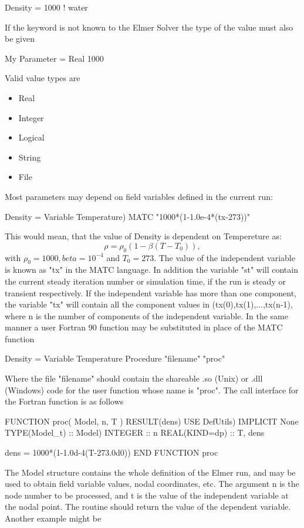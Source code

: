 \ttbegin
Density  = 1000 ! water
\ttend

If the keyword is not known to the Elmer Solver the type of the
value  must also be given

\ttbegin
My Parameter = Real 1000
\ttend

Valid value types are
\begin{itemize}
\item Real
\item Integer
\item Logical
\item String
\item File
\end{itemize}
Most parameters may depend on field variables defined in the current run:

\ttbegin
Density = Variable Temperature)
  MATC "1000*(1-1.0e-4*(tx-273))"
\ttend

This would mean, that the value of Density is dependent on Tempereture as:
\begin{equation}
  \rho =  \rho_0(1-\beta(T-T_0)),
\end{equation}
with $\rho_0=1000, beta=10^{-4}$ and $T_0=273$.
The value of the independent variable is known as "tx" in the MATC language.
In addition the variable "st" will contain the current steady iteration
number or simulation time, if the run is steady or transient respectively.
If the independent variable has more than one component, the variable "tx"
will contain all the component values in (tx(0),tx(1),...,tx(n-1), where n
is the number of components of the independent variable. In the same manner
a user Fortran 90 function may be substituted in  place of the MATC function

\ttbegin
Density  = Variable Temperature
  Procedure "filename" "proc"
\ttend

Where the file "filename" should contain the shareable .so (Unix) or .dll
(Windows) code for the user function whose name is "proc".  The call interface
for the Fortran function is as follows

\ttbegin
FUNCTION proc( Model, n, T ) RESULT(dens)
  USE DefUtils)
  IMPLICIT None
  TYPE(Model_t) :: Model)
  INTEGER :: n
  REAL(KIND=dp) :: T, dens

  dens = 1000*(1-1.0d-4(T-273.0d0))
END FUNCTION proc
\ttend

The Model structure contains the whole definition of the Elmer run, and may be
used to obtain field variable values, nodal coordinates, etc. The argument n is
the node number to be processed, and t is the value of the independent variable
at the nodal point. The routine should return the value  of the dependent
variable. Another example might be


